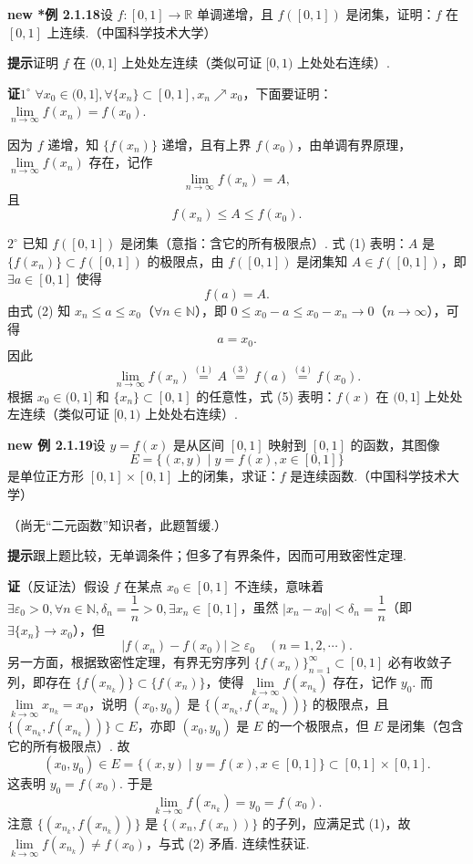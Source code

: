 \documentclass[UTF8, 12pt, fontset=fandol, oneside]{ctexart}
\begin{document}
\noindent\textbf{new *例 2.1.18}\quad 设 $f:[0,1]\to\mathbb{R}$ 单调递增，且 $f([0,1])$ 是闭集，证明：$f$ 在 $[0,1]$ 上连续.（中国科学技术大学）

\noindent\textbf{提示}\quad 证明 $f$ 在 $(0,1]$ 上处处左连续（类似可证 $[0,1)$ 上处处右连续）.

\noindent\textbf{证}\quad $1^\circ$ $\forall x_0\in(0,1],\forall\{x_n\}\subset[0,1],x_n\nearrow x_0$，下面要证明：$\lim\limits_{n\to\infty}f(x_n)=f(x_0)$.

因为 $f$ 递增，知 $\{f(x_n)\}$ 递增，且有上界 $f(x_0)$，由单调有界原理，$\lim\limits_{n\to\infty}f(x_n)$ 存在，记作
\[
  \lim_{n\to\infty}f(x_n)=A,
\tag{1}
\]
且
\[
  f(x_n)\le A\le f(x_0).
\tag{2}
\]

$2^\circ$ 已知 $f([0,1])$ 是闭集（意指：含它的所有极限点）. 式 (1) 表明：$A$ 是 $\{f(x_n)\}\subset f([0,1])$ 的极限点，由 $f([0,1])$ 是闭集知 $A\in f([0,1])$，即 $\exists a\in[0,1]$ 使得
\[
  f(a)=A.
\tag{3}
\]
由式 (2) 知 $x_n\le a\le x_0$（$\forall n\in\mathbb{N}$），即 $0\le x_0-a\le x_0-x_n\to0$（$n\to\infty$），可得
\[
  a=x_0.
\tag{4}
\]
因此
\[
  \lim_{n\to\infty}f(x_n)\overset{(1)}=A\overset{(3)}=f(a)\overset{(4)}=f(x_0).
\tag{5}
\]
根据 $x_0\in(0,1]$ 和 $\{x_n\}\subset[0,1]$ 的任意性，式 (5) 表明：$f(x)$ 在 $(0,1]$ 上处处左连续（类似可证 $[0,1)$ 上处处右连续）.

\noindent\textbf{new 例 2.1.19}\quad 设 $y=f(x)$ 是从区间 $[0,1]$ 映射到 $[0,1]$ 的函数，其图像
\[
  E=\{(x,y)\mid y=f(x),x\in[0,1]\}
\]
是单位正方形 $[0,1]\times[0,1]$ 上的闭集，求证：$f$ 是连续函数.（中国科学技术大学）

（尚无“二元函数”知识者，此题暂缓.）

\noindent\textbf{提示}\quad 跟上题比较，无单调条件；但多了有界条件，因而可用致密性定理.

\noindent\textbf{证}\quad （反证法）假设 $f$ 在某点 $x_0\in[0,1]$ 不连续，意味着 $\exists\varepsilon_0>0,\forall n\in\mathbb{N},\delta_n=\dfrac1n>0,\exists x_n\in[0,1]$，虽然 $|x_n-x_0|<\delta_n=\dfrac1n$（即 $\exists\{x_n\}\to x_0$），但
\[
  |f(x_n)-f(x_0)|\ge\varepsilon_0\quad(n=1,2,\cdots).
\tag{1}
\]
另一方面，根据致密性定理，有界无穷序列 $\{f(x_n)\}_{n=1}^{\infty}\subset[0,1]$ 必有收敛子列，即存在 $\{f(x_{n_k})\}\subset\{f(x_n)\}$，使得 $\lim\limits_{k\to\infty}f(x_{n_k})$ 存在，记作 $y_0$. 而 $\lim\limits_{k\to\infty}x_{n_k}=x_0$，说明 $(x_0,y_0)$ 是 $\{(x_{n_k},f(x_{n_k}))\}$ 的极限点，且 $\{(x_{n_k},f(x_{n_k}))\}\subset E$，亦即 $(x_0,y_0)$ 是 $E$ 的一个极限点，但 $E$ 是闭集（包含它的所有极限点）. 故
\[
  (x_0,y_0)\in E=\{(x,y)\mid y=f(x),x\in[0,1]\}\subset[0,1]\times[0,1].
\]
这表明 $y_0=f(x_0)$. 于是
\[
  \lim_{k\to\infty}f(x_{n_k})=y_0=f(x_0).
\tag{2}
\]
注意 $\{(x_{n_k},f(x_{n_k}))\}$ 是 $\{(x_n,f(x_n))\}$ 的子列，应满足式 (1)，故 $\lim\limits_{k\to\infty}f(x_{n_k})\ne f(x_0)$，与式 (2) 矛盾. 连续性获证.
\end{document}
